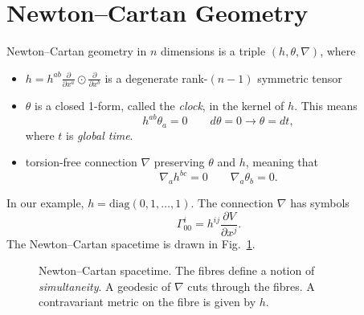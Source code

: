 \section{Newton--Cartan Geometry}%
\label{sec:newton_cartan_geometry}

Newton--Cartan geometry in $n$ dimensions is a triple $(h, \theta, \nabla)$, where
\begin{itemize}
  \item $h = h^{ab} \frac{\partial }{\partial x^{a}} \odot \frac{\partial }{\partial x^{b}}$ is a degenerate rank-$(n-1)$ symmetric tensor
  \item $\theta$ is a closed 1-form, called the \emph{clock}, in the kernel of $h$. This means
    \begin{equation}
      h^{ab} \theta_{a} = 0 \qquad d\theta = 0 \rightarrow \theta = d t,
    \end{equation}
    where $t$ is \emph{global time}.
  \item torsion-free connection $\nabla$ preserving $\theta$ and $h$, meaning that
    \begin{equation}
      \nabla_a h^{bc} = 0 \qquad \nabla_a \theta_b = 0.
    \end{equation}
\end{itemize}
In our example, $h = \text{diag}(0,1, \dots, 1)$. The connection $\nabla$ has symbols
\begin{equation}
  \Gamma^i_{00} = h^{ij} \frac{\partial V}{\partial x^{j}}.
\end{equation}
The Newton--Cartan spacetime is drawn in Fig.~\ref{fig:l9f4}.
\begin{figure}[tbhp]
  \centering
  \def\svgwidth{0.4\columnwidth}
  
  \caption{Newton--Cartan spacetime. The fibres define a notion of \emph{simultaneity}. A geodesic of $\nabla$ cuts through the fibres. A contravariant metric on the fibre is given by $h$.}
  \label{fig:l9f4}
\end{figure}
